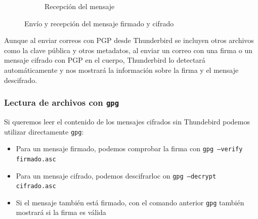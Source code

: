 \begin{figure}[H]
\begin{subfigure}{.5\textwidth}
        \caption{Recepción del mensaje}
    \end{subfigure}
    \caption{Envío y recepción del mensaje firmado y cifrado}
\end{figure}

Aunque al enviar correos con PGP desde Thunderbird se incluyen otros archivos como la clave pública y otros metadatos, al enviar un correo con una firma o un mensaje cifrado con PGP en el cuerpo, Thunderbird lo detectará automáticamente y nos mostrará la información sobre la firma y el mensaje descifrado.

\subsubsection{Lectura de archivos con \texttt{gpg}}

Si queremos leer el contenido de los mensajes cifrados sin Thundebird podemos utilizar directamente \texttt{gpg}:

\begin{itemize}
    \item Para un mensaje firmado, podemos comprobar la firma con \texttt{gpg --verify firmado.asc}
    \item Para un mensaje cifrado, podemos descifrarloc on \texttt{gpg --decrypt cifrado.asc}
    \item Si el mensaje también está firmado, con el comando anterior \texttt{gpg} también mostrará si la firma es válida
\end{itemize}